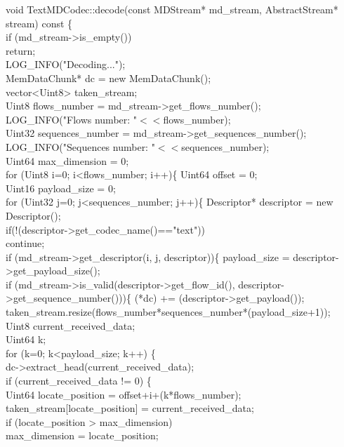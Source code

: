 \begin{code}
void TextMDCodec::decode(const MDStream* md\_stream, AbstractStream* stream) const \{\\
	if (md\_stream->is\_empty()) \\
		return;\\
	LOG\_INFO("Decoding...");\\
	MemDataChunk* dc = new MemDataChunk();\\
	vector<Uint8> taken\_stream;\\
	Uint8 flows\_number = md\_stream->get\_flows\_number();\\
	LOG\_INFO("Flows number: "$<<$flows\_number);\\
	Uint32 sequences\_number = md\_stream->get\_sequences\_number();\\
	LOG\_INFO("Sequences number: "$<<$sequences\_number);\\
	Uint64 max\_dimension = 0;\\
	for (Uint8 i=0; i<flows\_number; i++)\{
		Uint64 offset = 0;\\
		Uint16 payload\_size = 0;\\
		for (Uint32 j=0; j<sequences\_number; j++)\{
			Descriptor* descriptor = new Descriptor();\\
			if(!(descriptor->get\_codec\_name()=="text"))\\
			continue;\\
			if (md\_stream->get\_descriptor(i, j, descriptor))\{
				payload\_size = descriptor->get\_payload\_size();\\
				if (md\_stream->is\_valid(descriptor->get\_flow\_id(), descriptor->get\_sequence\_number()))\{
					(*dc) += (descriptor->get\_payload());\\
					taken\_stream.resize(flows\_number*sequences\_number*(payload\_size+1));\\
					Uint8 current\_received\_data;\\
					Uint64 k;\\
					for (k=0; k<payload\_size; k++) \{\\
						dc->extract\_head(current\_received\_data);\\
						if (current\_received\_data != 0) \{\\
							Uint64 locate\_position = offset+i+(k*flows\_number);\\
							taken\_stream[locate\_position] = current\_received\_data;\\
							if (locate\_position > max\_dimension)\\
								max\_dimension = locate\_position;\\

\end{code}
